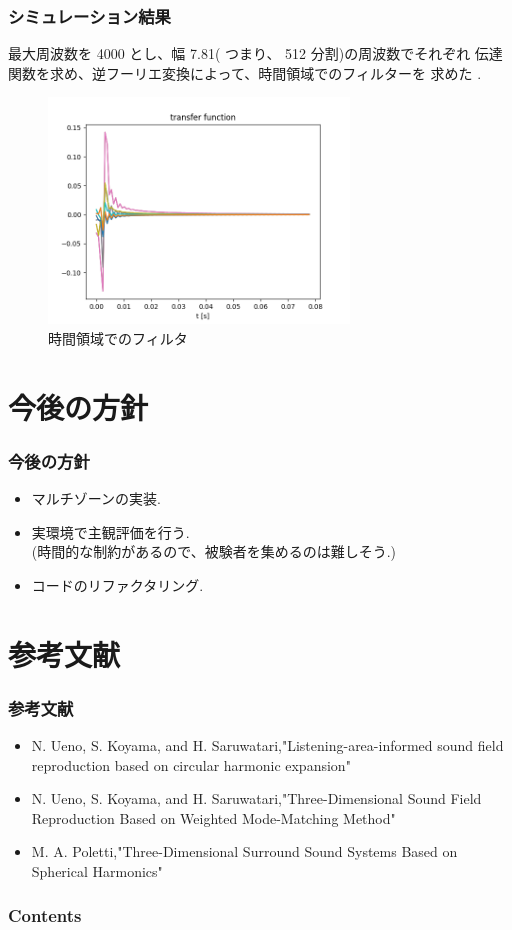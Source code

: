 \documentclass[uplatex,dvipdfmx,11pt,notheorems]{beamer}
\theoremstyle{definition}
\begin{document}
\begin{frame}\frametitle{シミュレーション結果}
最大周波数を 4000 とし、幅 7.81( つまり、 512 分割)の周波数でそれぞれ
伝達関数を求め、逆フーリエ変換によって、時間領域でのフィルターを
求めた .
    \begin{figure}[tb]
	\includegraphics[width=8cm,clip]{intersimu3.png}
	\caption{時間領域でのフィルタ}
	\end{figure}
 \end{frame}



\section{今後の方針}
 \begin{frame}\frametitle{今後の方針}
 \begin{itemize}
    \item マルチゾーンの実装.
    \item 実環境で主観評価を行う.\\(時間的な制約があるので、被験者を集めるのは難しそう.)
    \item コードのリファクタリング.
\end{itemize}
 \end{frame}

 \section{参考文献}
 \begin{frame}\frametitle{参考文献}
    \begin{itemize}
        \item N. Ueno, S. Koyama, and H. Saruwatari,"Listening-area-informed sound field reproduction based on circular harmonic expansion"
        \item N. Ueno, S. Koyama, and H. Saruwatari,"Three-Dimensional Sound Field Reproduction Based on Weighted Mode-Matching Method"
        \item M. A. Poletti,"Three-Dimensional Surround Sound Systems Based on Spherical Harmonics"
    \end{itemize}
\end{frame}

 \begin{frame}\frametitle{Contents}
 \tableofcontents %
 \end{frame}
\end{document}
